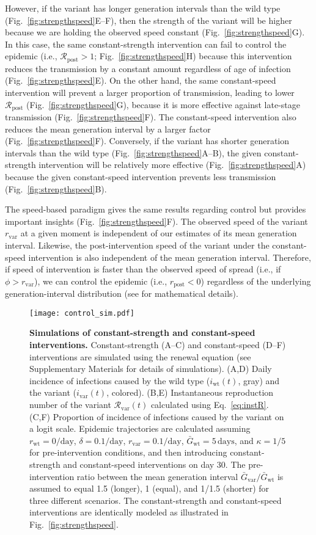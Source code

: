 \documentclass[12pt]{article}
\newcommand{\eref}[1]{Eq.~\ref{eq:#1}}
\newcommand{\fref}[1]{Fig.~\ref{fig:#1}}
\newcommand{\vvvar}{\mathrm{var}}
\newcommand{\wwwt}{\mathrm{wt}}
\newcommand{\rx}[1]{\ensuremath{{r}_{#1}}\xspace}
\newcommand{\ry}[1]{\rx{\mathrm{#1}}}
\newcommand{\rw}{\rx{\wwwt}}
\newcommand{\rv}{\rx{\vvvar}}
\newcommand{\Rx}[1]{\ensuremath{{\mathcal R}_{#1}}\xspace}
\newcommand{\Ry}[1]{\Rx{\mathrm{#1}}}
\newcommand{\Rv}{\Rx{\vvvar}}
\newcommand{\pday}{\ensuremath{/\textrm{day}}}
\newcommand{\ix}[1]{\ensuremath{{i}_{#1}}\xspace}
\newcommand{\iw}{\ix{\wwwt}}
\newcommand{\iv}{\ix{\vvvar}}
\newcommand{\Gx}[1]{\ensuremath{{\bar G}_{#1}}\xspace}
\newcommand{\Gy}[1]{\Gx{\mathrm{#1}}}
\begin{document}
However, if the variant has longer generation intervals than the wild type (\fref{strengthspeed}E--F), then the strength of the variant will be higher because we are holding the observed speed constant (\fref{strengthspeed}G).
In this case, the same constant-strength intervention can fail to control the epidemic (i.e., $\Ry{post} > 1$; \fref{strengthspeed}H) because this intervention reduces the transmission by a constant amount regardless of age of infection (\fref{strengthspeed}E).
On the other hand, the same constant-speed intervention will prevent a larger proportion of transmission, leading to lower $\Ry{post}$ (\fref{strengthspeed}G), because it is more effective against late-stage transmission (\fref{strengthspeed}F).
The constant-speed intervention also reduces the mean generation interval by a larger factor (\fref{strengthspeed}F).
Conversely, if the variant has shorter generation intervals than the wild type (\fref{strengthspeed}A--B), the given constant-strength intervention will be relatively more effective (\fref{strengthspeed}A) because the given constant-speed intervention prevents less transmission (\fref{strengthspeed}B).

The speed-based paradigm gives the same results regarding control but provides important insights (\fref{strengthspeed}F).
The observed speed of the variant $\rv$ at a given moment is independent of our estimates of its mean generation interval.
Likewise, the post-intervention speed of the variant under the constant-speed intervention is also independent of the mean generation interval.
Therefore, if speed of intervention is faster than the observed speed of spread (i.e., if $\phi > \rv$), we can control the epidemic (i.e., $\ry{post} < 0$) regardless of the underlying generation-interval distribution (see \cite{doi:10.1098/rspb.2020.1556} for mathematical details).

\begin{figure}[!th]
\begin{center}
\texttt{[image: control\_sim.pdf]}
\caption{
\textbf{Simulations of constant-strength and constant-speed interventions.}
Constant-strength (A--C) and constant-speed (D--F) interventions are simulated using the renewal equation (see Supplementary Materials for details of simulations).
(A,D) Daily incidence of infections caused by the wild type ($\iw(t)$, gray) and the variant ($\iv(t)$, colored).
(B,E) Instantaneous reproduction number of the variant $\Rv(t)$ calculated using \eref{instR}.
(C,F) Proportion of incidence of infections caused by the variant on a logit scale. 
Epidemic trajectories are calculated assuming $\rw=0\pday$, $\delta=0.1\pday$, $\rv=0.1\pday$, $\Gy{wt}=5\,\textrm{days}$, and $\kappa=1/5$ for pre-intervention conditions, and then introducing constant-strength and constant-speed interventions on day 30.
The pre-intervention ratio between the mean generation interval $\Gy{var}/\Gy{wt}$ is assumed to equal 1.5 (longer), 1 (equal), and 1/1.5 (shorter) for three different scenarios.
The constant-strength and constant-speed interventions are identically modeled as illustrated in \fref{strengthspeed}.
}
\label{fig:control_sim}
\end{center}
\end{figure}
\end{document}
